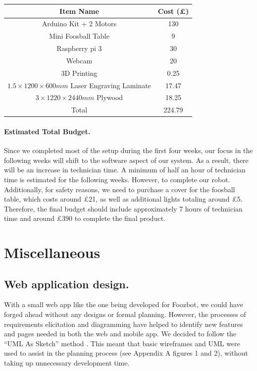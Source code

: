 \documentclass{article}
\begin{document}
\begin{center}
\begin{tabular}{ |c|c| } 
 \hline
 Item Name & Cost (£) \\ 
 \hline
 Arduino Kit + 2 Motors & 130 \\
 \hline
 Mini Foosball Table & 9 \\
 \hline
 Raspberry pi 3 & 30 \\ 
 \hline
 Webcam & 20 \\ 
 \hline
 3D Printing & 0.25 \\
 \hline
 $1.5\times1200\times600mm$ Laser Engraving Laminate & 17.47 \\
 \hline
 $3\times1220\times2440mm$ Plywood & 18.25\\
 \hline
 Total & 224.79\\
 \hline
\end{tabular}
\end{center}

\paragraph{Estimated Total Budget.} Since we completed most of the setup during the first four weeks, our focus in the following weeks will shift to the software aspect of our system. As a result, there will be an increase in technician time. A minimum of half an hour of technician time is estimated for the following weeks. However, to complete our robot. Additionally, for safety reasons, we need to purchase a cover for the foosball table, which costs around £21, as well as additional lights totaling around £5. Therefore, the final budget should include approximately 7 hours of technician time and around £390 to complete the final product.

\section{Miscellaneous}

\subsection{Web application design.} With a small web app like the one being developed for Foozbot, we could have forged ahead without any designs or formal planning. However, the processes of requirements elicitation and diagramming have helped to identify new features and pages needed in both the web and mobile app. 
We decided to follow the “UML As Sketch” method \cite{UMLAsSketch}. This meant that basic wireframes and UML were used to assist in the planning process (see Appendix A figures 1 and 2), without taking up unnecessary development time. 
\end{document}

